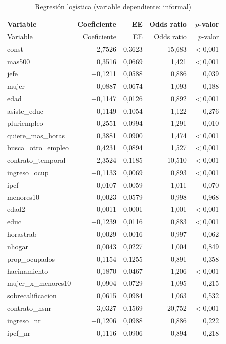 \begin{longtable}{lrrrr}
\caption{Regresión logística (variable dependiente: informal)}\label{tab:logit}\\
\toprule
Variable & Coeficiente & EE & Odds ratio & $p$-valor \\
\midrule
\endfirsthead
\toprule Variable & Coeficiente & EE & Odds ratio & $p$-valor \\ \midrule
\endhead
const & 2,7526 & 0,3623 & 15,683 & $<$0,001 \\
mas500 & 0,3516 & 0,0669 & 1,421 & $<$0,001 \\
jefe & $-$0,1211 & 0,0588 & 0,886 & 0,039 \\
mujer & 0,0887 & 0,0674 & 1,093 & 0,188 \\
edad & $-$0,1147 & 0,0126 & 0,892 & $<$0,001 \\
asiste\_educ & 0,1149 & 0,1054 & 1,122 & 0,276 \\
pluriempleo & 0,2551 & 0,0994 & 1,291 & 0,010 \\
quiere\_mas\_horas & 0,3881 & 0,0900 & 1,474 & $<$0,001 \\
busca\_otro\_empleo & 0,4231 & 0,0894 & 1,527 & $<$0,001 \\
contrato\_temporal & 2,3524 & 0,1185 & 10,510 & $<$0,001 \\
ingreso\_ocup & $-$0,1133 & 0,0069 & 0,893 & $<$0,001 \\
ipcf & 0,0107 & 0,0059 & 1,011 & 0,070 \\
menores10 & $-$0,0023 & 0,0579 & 0,998 & 0,968 \\
edad2 & 0,0011 & 0,0001 & 1,001 & $<$0,001 \\
educ & $-$0,1239 & 0,0116 & 0,883 & $<$0,001 \\
horastrab & $-$0,0029 & 0,0016 & 0,997 & 0,062 \\
nhogar & 0,0043 & 0,0227 & 1,004 & 0,849 \\
prop\_ocupados & $-$0,1154 & 0,1255 & 0,891 & 0,358 \\
hacinamiento & 0,1870 & 0,0467 & 1,206 & $<$0,001 \\
mujer\_x\_menores10 & 0,0904 & 0,0729 & 1,095 & 0,215 \\
sobrecalificacion & 0,0615 & 0,0984 & 1,063 & 0,532 \\
contrato\_nsnr & 3,0327 & 0,1569 & 20,752 & $<$0,001 \\
ingreso\_nr & $-$0,1206 & 0,0988 & 0,886 & 0,222 \\
ipcf\_nr & $-$0,1116 & 0,0906 & 0,894 & 0,218 \\

\end{longtable}

